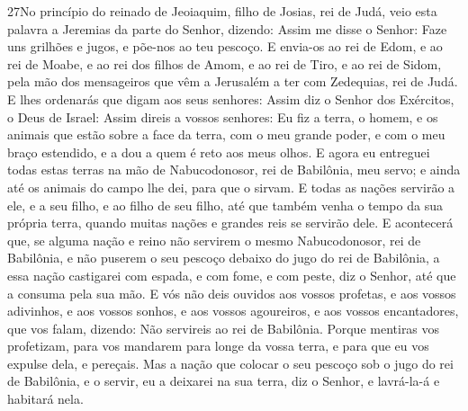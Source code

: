 \medskip

\lettrine{27} No princípio do reinado de Jeoiaquim, filho de
Josias, rei de Judá, veio esta palavra a Jeremias da parte do
Senhor, dizendo: Assim me disse o Senhor: Faze uns grilhões e
jugos, e põe-nos ao teu pescoço. E envia-os ao rei de Edom, e ao
rei de Moabe, e ao rei dos filhos de Amom, e ao rei de Tiro, e ao
rei de Sidom, pela mão dos mensageiros que vêm a Jerusalém a ter com
Zedequias, rei de Judá. E lhes ordenarás que digam aos seus
senhores: Assim diz o Senhor dos Exércitos, o Deus de Israel: Assim
direis a vossos senhores: Eu fiz a terra, o homem, e os animais
que estão sobre a face da terra, com o meu grande poder, e com o meu
braço estendido, e a dou a quem é reto aos meus olhos. E agora
eu entreguei todas estas terras na mão de Nabucodonosor, rei de
Babilônia, meu servo; e ainda até os animais do campo lhe dei, para
que o sirvam. E todas as nações servirão a ele, e a seu filho, e
ao filho de seu filho, até que também venha o tempo da sua própria
terra, quando muitas nações e grandes reis se servirão dele. E
acontecerá que, se alguma nação e reino não servirem o mesmo
Nabucodonosor, rei de Babilônia, e não puserem o seu pescoço debaixo
do jugo do rei de Babilônia, a essa nação castigarei com espada, e
com fome, e com peste, diz o Senhor, até que a consuma pela sua mão.
E vós não deis ouvidos aos vossos profetas, e aos vossos
adivinhos, e aos vossos sonhos, e aos vossos agoureiros, e aos
vossos encantadores, que vos falam, dizendo: Não servireis ao rei de
Babilônia. Porque mentiras vos profetizam, para vos mandarem
para longe da vossa terra, e para que eu vos expulse dela, e
pereçais. Mas a nação que colocar o seu pescoço sob o jugo do
rei de Babilônia, e o servir, eu a deixarei na sua terra, diz o
Senhor, e lavrá-la-á e habitará nela.

